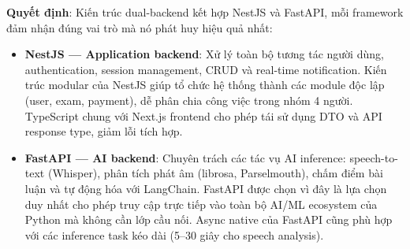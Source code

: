 \begin{table}[H]
    \centering
    \caption{So sánh backend framework theo yêu cầu dự án}
    \label{tab:framework_comparison}
    \scriptsize
\end{table}

\textbf{Quyết định}: Kiến trúc dual-backend kết hợp NestJS và FastAPI, mỗi framework đảm nhận đúng vai trò mà nó phát huy hiệu quả nhất:

\begin{itemize}
\item \textbf{NestJS --- Application backend}: Xử lý toàn bộ tương tác người dùng, authentication, session management, CRUD và real-time notification. Kiến trúc modular của NestJS giúp tổ chức hệ thống thành các module độc lập (user, exam, payment), dễ phân chia công việc trong nhóm 4 người. TypeScript chung với Next.js frontend cho phép tái sử dụng DTO và API response type, giảm lỗi tích hợp.

\item \textbf{FastAPI --- AI backend}: Chuyên trách các tác vụ AI inference: speech-to-text (Whisper), phân tích phát âm (librosa, Parselmouth), chấm điểm bài luận và tự động hóa với LangChain. FastAPI được chọn vì đây là lựa chọn duy nhất cho phép truy cập trực tiếp vào toàn bộ AI/ML ecosystem của Python mà không cần lớp cầu nối. Async native của FastAPI cũng phù hợp với các inference task kéo dài (5--30 giây cho speech analysis).
\end{itemize}

